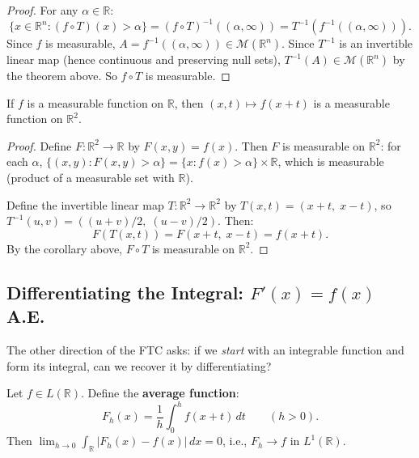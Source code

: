 \documentclass[11pt]{report}
\begin{document}
\begin{proof}
For any $\alpha \in \mathbb{R}$:
\[
\{x \in \mathbb{R}^n : (f \circ T)(x) > \alpha\} = (f \circ T)^{-1}((\alpha, \infty)) = T^{-1}(f^{-1}((\alpha, \infty))).
\]
Since $f$ is measurable, $A = f^{-1}((\alpha, \infty)) \in \mathcal{M}(\mathbb{R}^n)$. Since $T^{-1}$ is an invertible linear map (hence continuous and preserving null sets), $T^{-1}(A) \in \mathcal{M}(\mathbb{R}^n)$ by the theorem above. So $f \circ T$ is measurable.
\end{proof}

\begin{propbox}
If $f$ is a measurable function on $\mathbb{R}$, then $(x, t) \mapsto f(x + t)$ is a measurable function on $\mathbb{R}^2$.
\end{propbox}

\begin{proof}
Define $F: \mathbb{R}^2 \to \mathbb{R}$ by $F(x, y) = f(x)$. Then $F$ is measurable on $\mathbb{R}^2$: for each $\alpha$, $\{(x,y) : F(x,y) > \alpha\} = \{x : f(x) > \alpha\} \times \mathbb{R}$, which is measurable (product of a measurable set with $\mathbb{R}$).

Define the invertible linear map $T: \mathbb{R}^2 \to \mathbb{R}^2$ by $T(x, t) = (x + t,\; x - t)$, so $T^{-1}(u, v) = ((u+v)/2,\; (u-v)/2)$. Then:
\[
F(T(x, t)) = F(x + t,\; x - t) = f(x + t).
\]
By the corollary above, $F \circ T$ is measurable on $\mathbb{R}^2$.
\end{proof}

\subsection{Differentiating the Integral: $F'(x) = f(x)$ A.E.}

The other direction of the FTC asks: if we \textit{start} with an integrable function and form its integral, can we recover it by differentiating?

\begin{lembox}
Let $f \in L(\mathbb{R})$. Define the \textbf{average function}:
\[
F_h(x) = \frac{1}{h}\int_0^h f(x + t)\,dt \qquad (h > 0).
\]
Then $\lim_{h \to 0} \int_{\mathbb{R}} |F_h(x) - f(x)|\,dx = 0$, i.e., $F_h \to f$ in $L^1(\mathbb{R})$.
\end{lembox}
\end{document}
